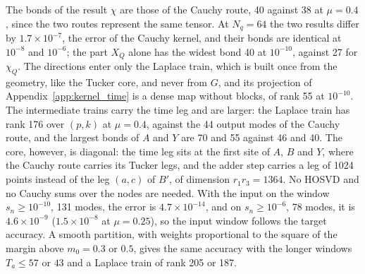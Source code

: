 \documentclass[aps,prb,reprint,a4paper]{revtex4-2}
\begin{document}
The bonds of the result $\chi$ are those of the Cauchy route, 40 against 38 at $\mu=0.4$, since the two routes represent the same tensor. At $N_q=64$ the two results differ by $1.7\times10^{-7}$, the error of the Cauchy kernel, and their bonds are identical at $10^{-8}$ and $10^{-6}$; the part $X_Q$ alone has the widest bond 40 at $10^{-10}$, against 27 for $\chi_Q$. The directions enter only the Laplace train, which is built once from the geometry, like the Tucker core, and never from $G$, and its projection of Appendix~\ref{app:kernel_time} is a dense map without blocks, of rank 55 at $10^{-10}$. The intermediate trains carry the time leg and are larger: the Laplace train has rank 176 over $(p,k)$ at $\mu=0.4$, against the 44 output modes of the Cauchy route, and the largest bonds of $A$ and $Y$ are 70 and 55 against 46 and 40. The core, however, is diagonal: the time leg sits at the first site of $A$, $B$ and $Y$, where the Cauchy route carries its Tucker legs, and the adder step carries a leg of 1024 points instead of the leg $(a,c)$ of $B'$, of dimension $r_1r_3=1364$. No HOSVD and no Cauchy sums over the nodes are needed. With the input on the window $s_n\ge10^{-10}$, 131 modes, the error is $4.7\times10^{-14}$, and on $s_n\ge10^{-6}$, 78 modes, it is $4.6\times10^{-9}$ ($1.5\times10^{-8}$ at $\mu=0.25$), so the input window follows the target accuracy. A smooth partition, with weights proportional to the square of the margin above $m_0=0.3$ or $0.5$, gives the same accuracy with the longer windows $T_a\le57$ or $43$ and a Laplace train of rank 205 or 187.
\end{document}
